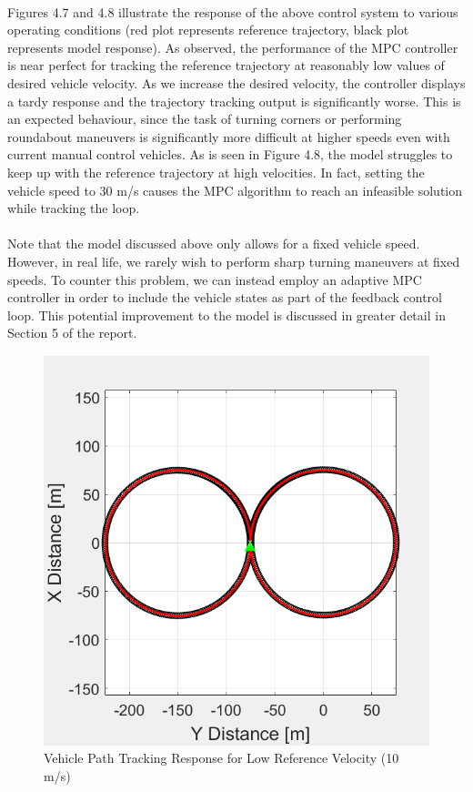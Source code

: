 \paragraph{}
Figures 4.7 and 4.8 illustrate the response of the above control system to various operating conditions (red plot represents reference trajectory, black plot represents model response). As observed, the performance of the MPC controller is near perfect for tracking the reference trajectory at reasonably low values of desired vehicle velocity. As we increase the desired velocity, the controller displays a tardy response and the trajectory tracking output is significantly worse. This is an expected behaviour, since the task of turning corners or performing roundabout maneuvers is significantly more difficult at higher speeds even with current manual control vehicles. As is seen in Figure 4.8, the model struggles to keep up with the reference trajectory at high velocities. In fact, setting the vehicle speed to 30 m/s causes the MPC algorithm to reach an infeasible solution while tracking the loop.

\paragraph{}
Note that the model discussed above only allows for a fixed vehicle speed. However, in real life, we rarely wish to perform sharp turning maneuvers at fixed speeds. To counter this problem, we can instead employ an adaptive MPC controller in order to include the vehicle states as part of the feedback control loop. This potential improvement to the model is discussed in greater detail in Section 5 of the report.

\begin{figure}[H]\label{fig4.7}
\centering \includegraphics[scale=0.8]{Images/low_velocity_tracking_response.png}
\caption{Vehicle Path Tracking Response for Low Reference Velocity (10 m/s)}
\end{figure}

